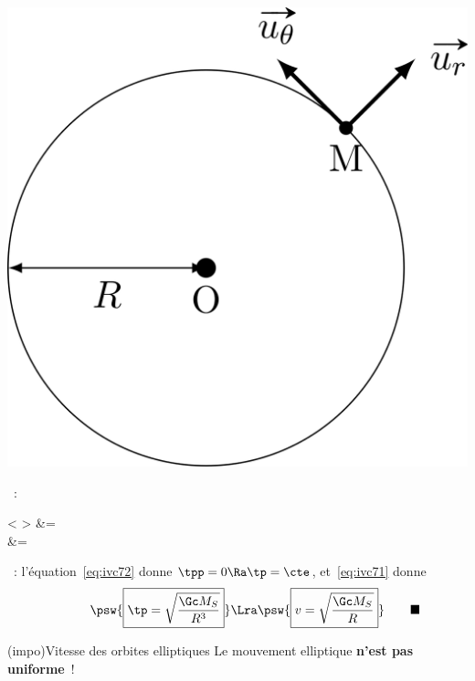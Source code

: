 \documentclass[../../main/main.tex]{subfiles}
\begin{document}
\begin{tcb*}
\begin{minipage}[t]{0.25\linewidth}
\begin{center}
{      }{
      \includegraphics[width=\linewidth]{kepler_3_circ}
      }
    \end{center}
  \end{minipage}
  \begin{enumerate}[label=\sqenumi, start=5]
    ~:
    \begin{DispWithArrows}<  \Lra >
       &= 
      \label{eq:ivc71}
      \\
       &= 
      \label{eq:ivc72}
    \end{DispWithArrows}
    ~:
    l'équation~\eqref{eq:ivc72} donne $\tpp = 0 \Ra \tp = \cte$,
    et~\eqref{eq:ivc71} donne
      \begin{equation}
        \psw{\boxed{\tp = \sqrt{\frac{\Gc M_S}{R^3}}}}
        \Lra
        \psw{\boxed{v = \sqrt{\frac{\Gc M_S}{R}}}}
        \rlap{$\qquad\blacksquare$}
        \label{eq:ivc73}
      \end{equation}
  \end{enumerate}
\end{tcb*}

\begin{tcb*}(impo){Vitesse des orbites elliptiques}
	Le mouvement elliptique \textbf{n'est pas uniforme}~!
\end{tcb*}
\end{document}
